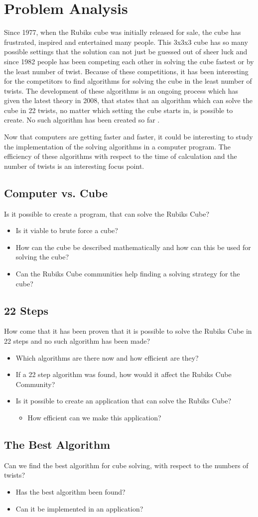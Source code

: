 \documentclass{report}
\begin{document}
\chapter{Problem Analysis}
Since 1977, when the Rubiks cube was initially released for sale, the cube has frustrated, inspired and entertained many people. This 3x3x3 cube has so many possible settings that the solution can not just be guessed out of sheer luck and since 1982 people has been competing each other in solving the cube fastest or by the least number of twist. Because of these competitions, it has been interesting for the competitors to find algorithms for solving the cube in the least number of twists. The development of these algorithms is an ongoing process which has given the latest theory in 2008, that states that an algorithm which can solve the cube in 22 twists, no matter which setting the cube starts in, is possible to create. No such algorithm has been created so far \cite{}.

Now that computers are getting faster and faster, it could be interesting to study the implementation of the solving algorithms in a computer program. The efficiency of these algorithms with respect to the time of calculation and the number of twists is an interesting focus point.
\section{Computer vs. Cube}
Is it possible to create a program, that can solve the Rubiks Cube?
\begin{itemize}
	\item Is it viable to brute force a cube?
	\item How can the cube be described mathematically and how can this be used for solving the cube?
	\item Can the Rubiks Cube communities help finding a solving strategy for the cube?
\end{itemize}

\section{22 Steps}
How come that it has been proven that it is possible to solve the Rubiks Cube in 22 steps and no such algorithm has been made?
\begin{itemize}
	\item Which algorithms are there now and how efficient are they?
	\item If a 22 step algorithm was found, how would it affect the Rubiks Cube Community?
	\item Is it possible to create an application that can solve the Rubiks Cube?
	\begin{itemize}
		\item How efficient can we make this application?
	\end{itemize}
\end{itemize}

\section{The Best Algorithm}
Can we find the best algorithm for cube solving, with respect to the numbers of twists?
\begin{itemize}
	\item Has the best algorithm been found?
	\item Can it be implemented in an application?
\end{itemize}
\end{document}
